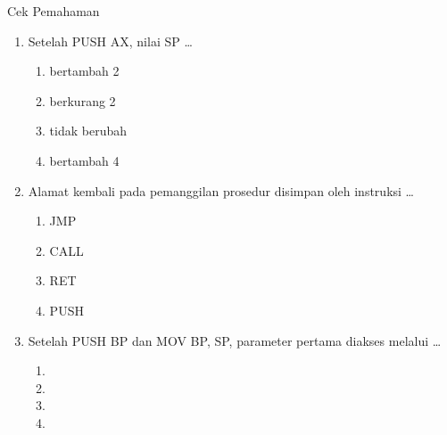 \documentclass[aspectratio=169,11pt]{beamer}
\begin{document}
\begin{frame}{Cek Pemahaman}
\footnotesize
\begin{enumerate}
    \item Setelah PUSH AX, nilai SP \dots
          \begin{enumerate}
              \item bertambah 2 \quad \item berkurang 2 \quad
              \item tidak berubah \quad \item bertambah 4
          \end{enumerate}

    \vspace{0.2em}
    \item Alamat kembali pada pemanggilan prosedur disimpan oleh
          instruksi \dots
          \begin{enumerate}
              \item JMP \quad \item CALL \quad
              \item RET \quad \item PUSH
          \end{enumerate}

    \vspace{0.2em}
    \item Setelah PUSH BP dan MOV BP, SP, parameter pertama diakses
          melalui \dots
          \begin{enumerate}
              \item [BP+0] \quad \item [BP+2] \quad
              \item [BP+4] \quad \item [BP+6]
          \end{enumerate}
\end{enumerate}
\end{frame}
\end{document}
